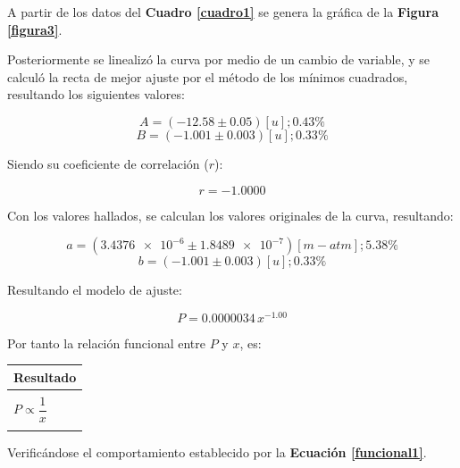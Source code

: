 \documentclass[letter,11pt]{article}
\begin{document}
A partir de los datos del \textbf{Cuadro \ref{cuadro1}} se genera la gráfica de
la \textbf{Figura \ref{figura3}}.

Posteriormente se linealizó la curva por medio de un cambio de variable, y se
calculó la recta de mejor ajuste por el método de los mínimos cuadrados,
resultando los siguientes valores:

\begin{equation*}
    A = (-12.58 \pm 0.05) [u]; 0.43\%
\end{equation*}
\begin{equation*}
    B = (-1.001 \pm 0.003) [u]; 0.33\%
\end{equation*}
\vspace{0.10cm}

Siendo su coeficiente de correlación ($r$):

\begin{equation*}
    r = -1.0000
\end{equation*}
\vspace{0.10cm}

Con los valores hallados, se calculan los valores originales de la curva,
resultando:

\begin{equation*}
    a = (\num{3.4376e-6} \pm \num{1.8489e-7}) [m-atm]; 5.38\%
\end{equation*}
\begin{equation*}
    b = (-1.001 \pm 0.003) [u]; 0.33\%
\end{equation*}
\vspace{0.10cm}

Resultando el modelo de ajuste:

\begin{equation*}
    P = 0.0000034\,x^{-1.00}
\end{equation*}
\vspace{0.10cm}

Por tanto la relación funcional entre $P$ y $x$, es:

\begin{center}
\begin{tabular}{|>{\centering}m{9.2cm}<{\centering}|}
\hline
\textbf{Resultado} 
\tabularnewline \hline
\\
$P \propto \dfrac{1}{x}$ \tabularnewline
\\
\hline
\end{tabular}
\end{center}
\vspace{0.10cm}

Verificándose el comportamiento establecido por la
\textbf{Ecuación \ref{funcional1}}.
\end{document}
